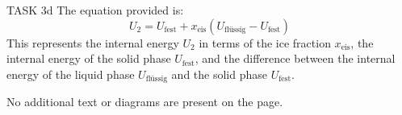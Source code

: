 TASK 3d  
The equation provided is:  
\[
U_2 = U_{\text{fest}} + x_{\text{eis}} \left( U_{\text{flüssig}} - U_{\text{fest}} \right)
\]  
This represents the internal energy \( U_2 \) in terms of the ice fraction \( x_{\text{eis}} \), the internal energy of the solid phase \( U_{\text{fest}} \), and the difference between the internal energy of the liquid phase \( U_{\text{flüssig}} \) and the solid phase \( U_{\text{fest}} \).  

No additional text or diagrams are present on the page.